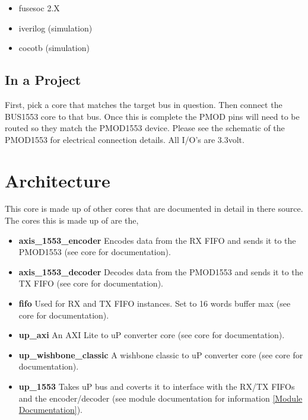 \begin{itemize}
  \item fusesoc 2.X
  \item iverilog (simulation)
  \item cocotb (simulation)
\end{itemize}







\subsection{In a Project}
\par
First, pick a core that matches the target bus in question. Then connect the BUS1553 core to that bus. Once this is complete the PMOD pins will need
to be routed so they match the PMOD1553 device. Please see the schematic of the PMOD1553 for electrical connection details. All I/O's are 3.3volt.

\section{Architecture}
\par
This core is made up of other cores that are documented in detail in there source. The cores this is made up of are the,
\begin{itemize}
  \item \textbf{axis\_1553\_encoder} Encodes data from the RX FIFO and sends it to the PMOD1553 (see core for documentation).
  \item \textbf{axis\_1553\_decoder} Decodes data from the PMOD1553 and sends it to the TX FIFO (see core for documentation).
  \item \textbf{fifo} Used for RX and TX FIFO instances. Set to 16 words buffer max (see core for documentation).
  \item \textbf{up\_axi} An AXI Lite to uP converter core (see core for documentation).
  \item \textbf{up\_wishbone\_classic} A wishbone classic to uP converter core (see core for documentation).
  \item \textbf{up\_1553} Takes uP bus and coverts it to interface with the RX/TX FIFOs and the encoder/decoder (see module documentation for information \ref{Module Documentation}).
\end{itemize}

